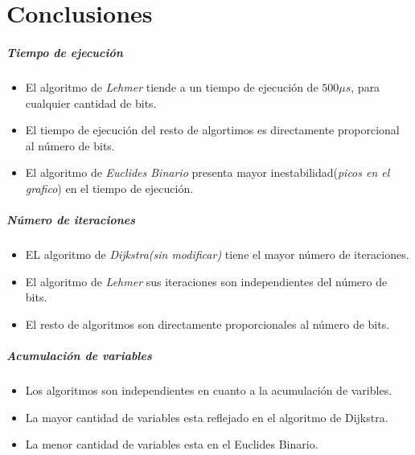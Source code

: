 \chapter{Conclusiones}

\paragraph{Tiempo de ejecución}

\begin{itemize}
    \item El algoritmo de \emph{Lehmer} tiende a un tiempo de ejecución de $500 \mu s$, para cualquier cantidad de bits.
    \item El tiempo de ejecución del resto de algortimos es directamente proporcional al número de bits.
    \item El algoritmo de \emph{Euclides Binario} presenta mayor inestabilidad(\emph{picos en el grafico}) en el tiempo de ejecución. 
\end{itemize}

\paragraph{Número de iteraciones}

\begin{itemize}                    
    \item EL algoritmo de \emph{Dijkstra(sin modificar)} tiene  el mayor número de iteraciones.
    \item El algoritmo de \emph{Lehmer} sus iteraciones son independientes del número de bits.
    \item El resto de algoritmos son directamente proporcionales al número de bits.
\end{itemize} 


\paragraph{Acumulación de variables}

\begin{itemize}                    
  \item Los algoritmos son independientes en cuanto a la acumulación de varibles.
  \item La mayor cantidad de variables esta reflejado en el algoritmo de Dijkstra.
  \item La menor cantidad de variables esta en el Euclides Binario.
\end{itemize} 
